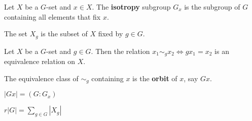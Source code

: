 \begin{definition}
	Let $X$ be a $G$-set and $x \in X$.
	The \textbf{isotropy} subgroup $G_x$ is the subgroup of $G$ containing all elements that fix $x$.
\end{definition}
	The set $X_g$ is the subset of $X$ fixed by $g \in G$.

\begin{theorem}
	Let $X$ be a $G$-set and $g \in G$.
	Then the relation $x_1 \sim_g x_2 \iff gx_1=x_2$ is an equivalence relation on $X$.
\end{theorem}

\begin{definition}
	The equivalence class of $\sim_g$ containing $x$ is the \textbf{orbit} of $x$, say $Gx$.
\end{definition}

\begin{theorem}
	$|Gx| = (G:G_x)$
\end{theorem}

\begin{theorem}
	$\displaystyle r |G| = \sum_{g \in G}|X_g|$
\end{theorem}
